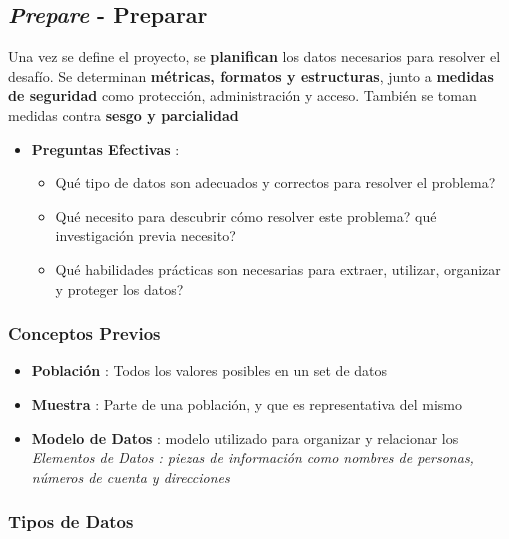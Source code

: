 

\subsection{\textit{Prepare} - Preparar}
Una vez se define el proyecto, se \textbf{planifican} los datos necesarios para resolver el desafío. Se determinan \textbf{métricas, formatos y estructuras}, junto a \textbf{medidas de seguridad} como protección, administración y acceso. También se toman medidas contra \textbf{sesgo y parcialidad}
\begin{itemize}
    \item {\textbf{Preguntas Efectivas} :
    \begin{itemize}
        \item {Qué tipo de datos son adecuados y correctos para resolver el problema?}
        \item {Qué necesito para descubrir cómo resolver este problema? qué investigación previa necesito?}
        \item {Qué habilidades prácticas son necesarias para extraer, utilizar, organizar y proteger los datos?}
    \end{itemize}}
\end{itemize}

\subsubsection{Conceptos Previos}
\begin{itemize}
    \item {\textbf{Población} : Todos los valores posibles en un set de datos}
    \item{\textbf{Muestra} : Parte de una población, y que es representativa del mismo}
    \item {\textbf{Modelo de Datos} : modelo utilizado para organizar y relacionar los \textit{Elementos de Datos : piezas de información como nombres de personas, números de cuenta y direcciones}}
\end{itemize}

\subsubsection{Tipos de Datos}

